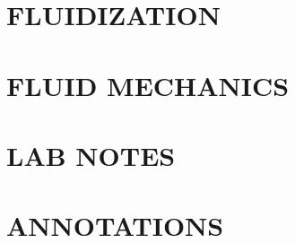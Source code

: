 \documentclass[fontsize=9pt, %
                             paper=letter, %
                             twoside, %
                             captions=tableheading,
                             index=totoc,
                             hyperref]{labbook}
\theoremstyle{definition}
\numberwithin{table}{chapter}
\numberwithin{figure}{chapter}
\begin{document}

\title{}

\author{
    \\ \\
    PhD Student
}
\date{\today}

\maketitle %

\printindex
\tableofcontents %
\listoffigures
\listoftables
\newpage %

\begin{addmargin}[4cm]{0cm} %

\pagestyle{scrheadings} %

\part{FLUIDIZATION}
% 

\part{FLUID MECHANICS}


% 
% 
\part{LAB NOTES}

\part{ANNOTATIONS}



\end{addmargin}


\end{document}
